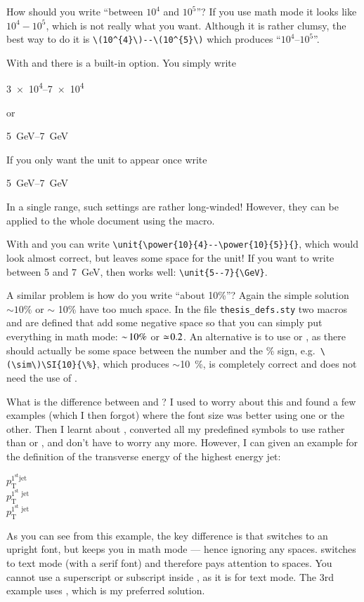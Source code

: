 How should you write \enquote{between \(10^{4}\) and \(10^{5}\)}?
If you use math mode it looks like \(10^{4} - 10^{5}\), which is not
really what you want. Although it is rather clumsy, the best way to do
it is \verb+\(10^{4}\)--\(10^{5}\)+ which produces
\enquote{\(10^{4}\)--\(10^{5}\)}.

With  and  there is a built-in option.
You simply write
\begin{LTXexample}
  \numrange{3e4}{7e4}
\end{LTXexample}
or
\begin{LTXexample}
  \SIrange[range-phrase=--]{5}{7}{\GeV}
\end{LTXexample}
If you only want the unit to appear once write
\begin{LTXexample}
  \SIrange[range-units=single, range-phrase=--]{5}{7}{\GeV}
\end{LTXexample}
In a single range, such settings are rather long-winded!
However, they can be applied to the whole
document using the  macro.

With  and  you can write
\verb+\unit{\power{10}{4}--\power{10}{5}}{}+, which would look almost
correct, but leaves some space for the unit! If you want to write
between 5 and \SI{7}{\GeV}, then  works well:
\verb+\unit{5--7}{\GeV}+.

A similar problem is how do you write \enquote{about 10\%}?  Again the
simple solution \(\sim 10\%\) or \(\sim\) 10\% have too much space. In the
file \texttt{thesis\_defs.sty} two macros  and
 are defined that add some negative space so that you
can simply put everything in math mode: \(\sim\! 10\%\) or \(\simeq\! 0.2\).
An alternative is to use  or , as there
should actually be some space between the number and the \% sign,
e.g.\ \verb+\(\sim\)\SI{10}{\%}+, which produces \(\sim\)\SI{10}{\%}, is
completely correct and does not need the use of .

What is the difference between  and
? I used to worry about this and found a
few examples (which I then forgot) where the font size was better
using one or the other. Then I learnt about ,
converted all my predefined symbols to use  rather than
 or , and don't have to worry any
more. However, I can given an example for the definition
of the transverse energy of the highest energy jet:
\begin{LTXexample}
  \(p_{\mathrm{T}}^{\mathrm{1^{\text{st}} jet}}\) \\
  \(p_{\textrm{T}}^{\textrm{1}^{\text{st}}\textrm{ jet}}\) \\
  \(p_{\text{T}}^{1^{\text{st}}\text{ jet}}\)
\end{LTXexample}
As you can see
from this example, the key difference is that  switches
to an upright font, but keeps you in math mode --- hence ignoring any
spaces.
 switches to text mode (with a serif font) and
therefore pays attention to spaces.
You cannot use a superscript or subscript inside ,
as it is for text mode.
The 3rd example uses , which is my preferred solution.


